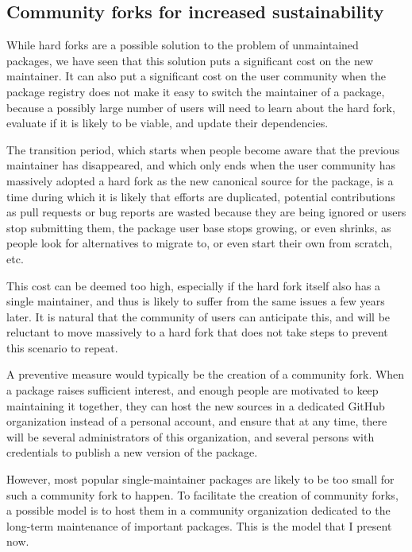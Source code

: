 \label{sec:community}

\subsection{Community forks for increased sustainability}

While hard forks are a possible solution to the problem of unmaintained packages, we have seen that this solution puts a significant cost on the new maintainer.
It can also put a significant cost on the user community when the package registry does not make it easy to switch the maintainer of a package, because a possibly large number of users will need to learn about the hard fork, evaluate if it is likely to be viable, and update their dependencies.

The transition period, which starts when people become aware that the previous maintainer has disappeared, and which only ends when the user community has massively adopted a hard fork as the new canonical source for the package, is a time during which it is likely that efforts are duplicated, potential contributions as pull requests or bug reports are wasted because they are being ignored or users stop submitting them, the package user base stops growing, or even shrinks, as people look for alternatives to migrate to, or even start their own from scratch, etc.

This cost can be deemed too high, especially if the hard fork itself also has a single maintainer, and thus is likely to suffer from the same issues a few years later.
It is natural that the community of users can anticipate this, and will be reluctant to move massively to a hard fork that does not take steps to prevent this scenario to repeat.

A preventive measure would typically be the creation of a community fork.
When a package raises sufficient interest, and enough people are motivated to keep maintaining it together, they can host the new sources in a dedicated GitHub organization instead of a personal account, and ensure that at any time, there will be several administrators of this organization, and several persons with credentials to publish a new version of the package.

However, most popular single-maintainer packages are likely to be too small for such a community fork to happen.
To facilitate the creation of community forks, a possible model is to host them in a community organization dedicated to the long-term maintenance of important packages.
This is the model that I present now.

